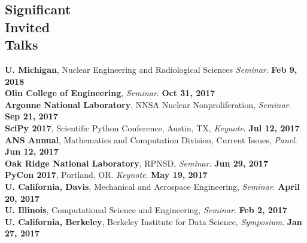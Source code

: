 \documentclass[margin,line]{resume}
\begin{document}
\begin{resume}
    \section{\mysidestyle Significant\\Invited\\Talks}
      \textbf{U. Michigan}, Nuclear Engineering and Radiological Sciences \emph{Seminar}.  \hfill\textbf{Feb 9, 2018}\\
      \textbf{Olin College of Engineering}, \emph{Seminar}.  \hfill\textbf{Oct 31, 2017}\\
      \textbf{Argonne National Laboratory}, NNSA Nuclear Nonproliferation, \emph{Seminar}.  \hfill\textbf{Sep 21, 2017}\\
      \textbf{SciPy 2017}, Scientific Python Conference, Austin, TX, \emph{Keynote}.  \hfill\textbf{Jul 12, 2017}\\
      \textbf{ANS Annual}, Mathematics and Computation Division, Current Issues, \emph{Panel}.  \hfill\textbf{Jun 12, 2017}\\
      \textbf{Oak Ridge National Laboratory}, RPNSD, \emph{Seminar}.  \hfill\textbf{Jun 29, 2017}\\
      \textbf{PyCon 2017}, Portland, OR. \emph{Keynote}.  \hfill\textbf{May 19, 2017}\\
      \textbf{U. California, Davis}, Mechanical and Aerospace Engineering, \emph{Seminar}.  \hfill\textbf{April 20, 2017}\\
      \textbf{U. Illinois}, Computational Science and Engineering, \emph{Seminar}.  \hfill\textbf{Feb 2, 2017}\\
      \textbf{U. California, Berkeley}, Berkeley Institute for Data Science, \emph{Symposium}.  \hfill\textbf{Jan 27, 2017}\\

\end{resume}
\end{document}

